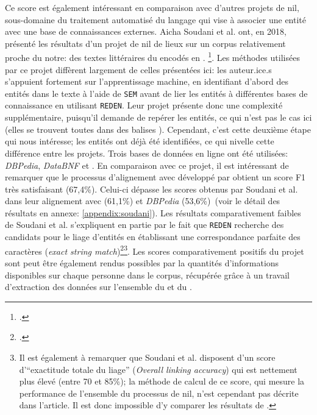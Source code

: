 Ce score est également intéressant en comparaison avec d'autres projets de \gls{nil}, sous-domaine du traitement automatisé du langage qui vise à associer une entité avec une base de connaissances externes. Aicha Soudani et al. ont, en 2018, présenté les résultats d'un projet de \gls{nil} de lieux sur un corpus relativement proche du notre: des textes littéraires du  encodés en \xmltei{}. \footcite{soudani_adaptation_2018}. Les méthodes utilisées par ce projet diffèrent largement de celles présentées ici: les auteur.ice.s s'appuient fortement sur l'apprentissage machine, en identifiant d'abord des entités dans le texte à l'aide de \texttt{SEM} avant de lier les entités à différentes bases de connaissance en utilisant \texttt{REDEN}. Leur projet présente donc une complexité supplémentaire, puisqu'il demande de repérer les entités, ce qui n'est pas le cas ici (elles se trouvent toutes dans des balises \tname{}). Cependant, c'est cette deuxième étape qui nous intéresse; les entités ont déjà été identifiées, ce qui nivelle cette différence entre les projets. Trois bases de données en ligne ont été utilisées: \textit{DBPedia}, \textit{DataBNF} et \wkd{}. En comparaison avec ce projet, il est intéressant de remarquer que le processus d'alignement avec \wkd{} développé par \mssktb{} obtient un \gls{score F1} très satisfaisant (67,4\%). Celui-ci dépasse les scores obtenus par Soudani et al. dans leur alignement avec \wkd{} (61,1\%) et \textit{DBPedia} (53,6\%)\ (voir le détail des résultats en annexe: \ref{appendix:soudani}). Les résultats comparativement faibles de Soudani et al. s'expliquent en partie par le fait que \texttt{REDEN} recherche des candidats pour le liage d'entités en établissant une correspondance parfaite des caractères (\textit{exact string match})\footcite[p. 4]{soudani_adaptation_2018}\footnote{Il est également à remarquer que Soudani et al. disposent d'un score d'\enquote{exactitude totale du liage} (\textit{Overall linking accuracy}) qui est nettement plus élevé (entre 70 et 85\%); la méthode de calcul de ce score, qui mesure la performance de l'ensemble du processus de \gls{nil}, n'est cependant pas décrite dans l'article. Il est donc impossible d'y comparer les résultats de \mssktb{}.}. Les scores comparativement positifs du projet \mssktb{} sont peut être également rendus possibles par la quantités d'informations disponibles sur chaque personne dans le corpus, récupérée grâce à un travail d'extraction des données sur l'ensemble du \ttrait{} et du \tname{}.

